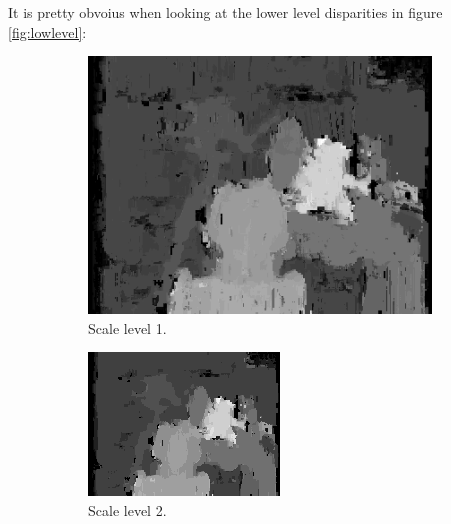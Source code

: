 \documentclass[12pt,a4paper,oneside,final]{article}
\begin{document}
\iffalse
{\color{red} It is pretty obvoius when looking at the lower level disparities in figure \ref{fig:lowlevel}:
	\begin{figure}[H]
		\centering
		\begin{subfigure}[b]{0.24\textwidth}
			\includegraphics[width=\textwidth]{disparity1set_1.png}
			\caption{Scale level 1.}
		\end{subfigure}
		\begin{subfigure}[b]{0.24\textwidth}
			\includegraphics[width=\textwidth]{disparity2set_1.png}
			\caption{Scale level 2.}
		\end{subfigure}
		\begin{subfigure}[b]{0.24\textwidth}

\end{subfigure}
\end{figure}}
\end{document}
